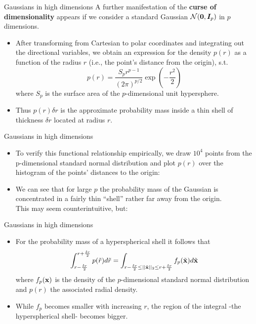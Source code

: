 \documentclass[11pt,compress,t,notes=noshow, xcolor=table]{beamer}
\begin{document}
\begin{framev}{Gaussians in high dimensions}
A further manifestation of the \textbf{curse of dimensionality} appears if we consider a standard Gaussian $\mathcal{N}(\mathbf{0}, \boldsymbol{I}_p)$ in $p$ dimensions.

\begin{itemize}
    \item After transforming from Cartesian to polar coordinates and integrating out the directional variables, we obtain an expression for the density $p(r)$ as a function of the radius $r$ (i.e., the point's distance from the origin), s.t.
    $$ p(r) = \frac{S_p r^{p-1}}{(2 \pi)^{p/2}} \exp(-\frac{r^2}{2})$$
    where $S_p$ is the surface area of the $p$-dimensional unit hypersphere.
    \item Thus $p(r) \delta r$ is the approximate probability mass inside a thin shell of thickness $\delta r$ located at radius $r$.
\end{itemize}
\end{framev}

\begin{framev}{Gaussians in high dimensions}
\begin{itemize}
\item To verify this functional relationship empirically, we draw $10^4$ points from the p-dimensional standard normal distribution and plot $p(r)$ over the histogram of the points' distances to the origin:


\item We can see that for large $p$ the probability mass of the Gaussian is concentrated in a fairly thin \enquote{shell} rather far away from the origin. \\
This may seem counterintuitive, but:
\end{itemize}
\end{framev}

\begin{framev}{Gaussians in high dimensions}
\begin{itemize}
  \item For the probability mass of a hyperspherical shell it follows that
    $$\int^{r + \frac{\delta r}{2}}_{r - \frac{\delta r}{2}}p(\tilde{r})d\tilde{r} = \int_{r - \frac{\delta r}{2} \leq ||\tilde{\mathbf{x}}||_2 \leq r + \frac{\delta r}{2}} f_p(\tilde{\mathbf{x}}) d\tilde{\mathbf{x}}$$
    where $f_p(\mathbf{x})$ is the density of the $p$-dimensional standard normal distribution and $p(r)$ the associated radial density.


\item While $f_p$ becomes smaller with increasing $r$, the region of the integral -the hyperspherical shell- becomes bigger.
\end{itemize}
\end{framev}
\end{document}
